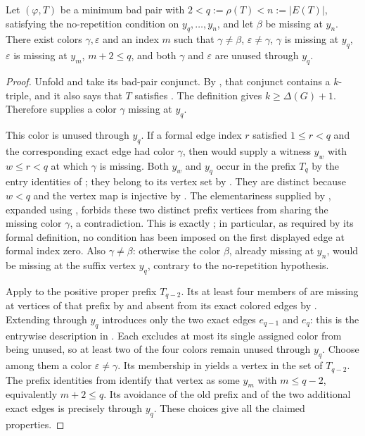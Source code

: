 \begin{helper}
Let \((\varphi,T)\) be a minimum bad pair with
\(2<q:=\rho(T)<n:=|E(T)|\), satisfying the no-repetition condition on
\(y_q,\ldots,y_n\), and let \(\beta\) be missing at \(y_n\).  There
exist colors \(\gamma,\varepsilon\) and an index \(m\) such that
\(\gamma\ne\beta\), \(\varepsilon\ne\gamma\), \(\gamma\) is missing
at \(y_q\), \(\varepsilon\) is missing at \(y_m\),
\(m+2\le q\), and both \(\gamma\) and \(\varepsilon\) are unused
through \(y_q\).
\end{helper}
\begin{proof}
Unfold  and take its bad-pair conjunct.
By , that conjunct contains a \(k\)-triple,
and it also says that \(T\) satisfies .
The definition  gives \(k\ge\Delta(G)+1\).  Therefore
 supplies a color
\(\gamma\) missing at \(y_q\).

This color is unused through \(y_q\).  If a formal edge index \(r\)
satisfied \(1\le r<q\) and the corresponding exact edge had color
\(\gamma\), then  would supply a witness
\(y_w\) with \(w\le r<q\) at which \(\gamma\) is missing.  Both
\(y_w\) and \(y_q\) occur in the prefix \(T_q\) by the entry identities
of ; they belong to its vertex set by
.  They are distinct because \(w<q\)
and the vertex map is injective by .  The
elementariness supplied by ,
expanded using , forbids these two
distinct prefix vertices from sharing the missing color \(\gamma\), a
contradiction.  This is exactly
; in particular, as required by its
formal definition, no condition has been imposed on the first displayed
edge at formal index zero.  Also \(\gamma\ne\beta\): otherwise the
color \(\beta\), already missing at \(y_n\), would be missing at the
suffix vertex \(y_q\), contrary to the no-repetition hypothesis.

Apply  to the positive proper prefix
\(T_{q-2}\).  Its at least four members of
 are missing at vertices of that prefix by
 and absent from its exact colored edges by
.  Extending through \(y_q\) introduces only
the two exact edges \(e_{q-1}\) and \(e_q\): this is the entrywise
description in .  Each excludes at most its
single assigned color from being unused, so at least two of the four
colors remain unused through \(y_q\).  Choose among them a color
\(\varepsilon\ne\gamma\).  Its membership in
 yields a vertex in the set
 of \(T_{q-2}\).  The prefix identities
from  identify that vertex as some \(y_m\)
with \(m\le q-2\), equivalently \(m+2\le q\).  Its avoidance of the old prefix and
of the two additional exact edges is precisely
 through \(y_q\).  These choices give
all the claimed properties.
\end{proof}
